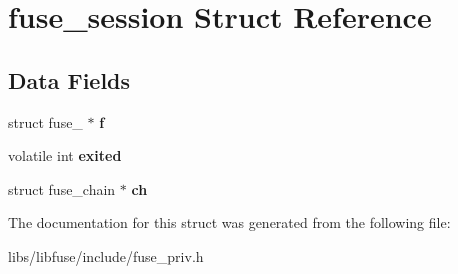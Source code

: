 \hypertarget{structfuse__session}{}\section{fuse\+\_\+session Struct Reference}
\label{structfuse__session}
\subsection*{Data Fields}
\begin{DoxyCompactItemize}
\item 
struct fuse\+\_ $\ast$ {\bfseries f}\hypertarget{structfuse__session_a9ac2e3f360e4b0bbde7c87e83434a371}{}\label{structfuse__session_a9ac2e3f360e4b0bbde7c87e83434a371}

\item 
volatile int {\bfseries exited}\hypertarget{structfuse__session_ad7b15ddbc17c51afcb6216fffe9ed8c9}{}\label{structfuse__session_ad7b15ddbc17c51afcb6216fffe9ed8c9}

\item 
struct fuse\+\_\+chain $\ast$ {\bfseries ch}\hypertarget{structfuse__session_aa2ca966daff6138a961f9e4b396b4bf2}{}\label{structfuse__session_aa2ca966daff6138a961f9e4b396b4bf2}

\end{DoxyCompactItemize}


The documentation for this struct was generated from the following file\+:\begin{DoxyCompactItemize}
\item 
libs/libfuse/include/fuse\+\_\+priv.\+h\end{DoxyCompactItemize}
